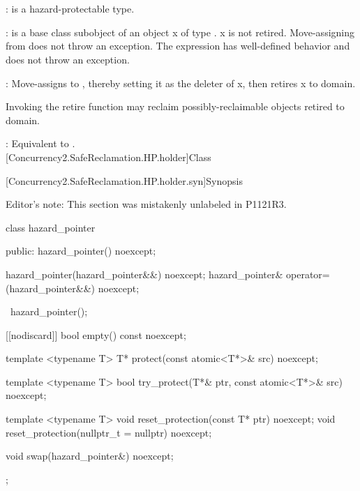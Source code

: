 \\
\hspace*{1.1em}\\
\hspace*{1.1em}

\pnum
{}:  is a hazard-protectable type.

\pnum
{}:  is a base class subobject of an object x of type . x is not retired.
Move-assigning  from  does not throw an exception. The expression  has well-defined behavior and does not throw an exception.

\pnum
{}: Move-assigns  to , thereby setting it as the deleter of x, then retires x
to domain.

\pnum
Invoking the retire function may reclaim possibly-reclaimable objects retired to domain.
\\


\pnum
{}: Equivalent to .
\\

[Concurrency2.SafeReclamation.HP.holder]{Class }

[Concurrency2.SafeReclamation.HP.holder.syn]{Synopsis}

Editor's note: This section was mistakenly unlabeled in P1121R3.

\begin{codeblock}
class hazard_pointer {
public:
  hazard_pointer() noexcept;

  hazard_pointer(hazard_pointer&&) noexcept;
  hazard_pointer& operator=(hazard_pointer&&) noexcept;

  ~hazard_pointer();
  
  [[nodiscard]] bool empty() const noexcept;
  
  template <typename T> T* protect(const atomic<T*>& src) noexcept;
  
  template <typename T> bool try_protect(T*& ptr, const atomic<T*>& src) noexcept;
  
  template <typename T> void reset_protection(const T* ptr) noexcept;
  void reset_protection(nullptr_t = nullptr) noexcept;
  
  void swap(hazard_pointer&) noexcept;
};
\end{codeblock}

